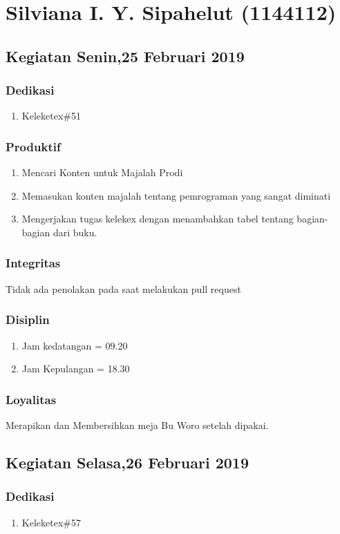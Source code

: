 \chapter{Silviana I. Y. Sipahelut (1144112)}

\section{Kegiatan Senin,25 Februari 2019}
\subsection{Dedikasi}
\begin{enumerate}
\item Keleketex\#51
\end{enumerate}
\subsection{Produktif}
\begin{enumerate}
\item Mencari Konten untuk Majalah Prodi
\item Memasukan konten majalah tentang pemrograman yang sangat diminati
\item Mengerjakan tugas kelekex dengan menambahkan tabel tentang bagian-bagian dari buku.
\end{enumerate}
\subsection{Integritas}
Tidak ada penolakan pada saat melakukan pull request
\subsection{Disiplin}
\begin{enumerate}
\item Jam kedatangan = 09.20
\item Jam Kepulangan = 18.30
\end{enumerate}
\subsection{Loyalitas}
Merapikan dan Membersihkan meja Bu Woro setelah dipakai.

\section{Kegiatan Selasa,26 Februari 2019}
\subsection{Dedikasi}
\begin{enumerate}
\item Keleketex\#57
\end{enumerate}
